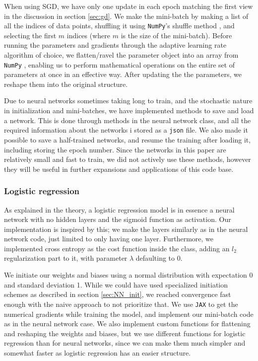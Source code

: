 When using SGD, we have only one update in each epoch matching the first view in the discussion in section \ref{sec:gd}.
We make the mini-batch by making a list of all the indices of data points, shuffling it using \texttt{NumPy}'s shuffle method \cite{NumPy-Array}, and selecting the first $m$ indices (where $m$ is the size of the mini-batch).
Before running the parameters and gradients through the adaptive learning rate algorithm of choice, we flatten/ravel the parameter object into an array from \texttt{NumPy} \cite{NumPy-Array}, enabling us to perform mathematical operations on the entire set of parameters at once in an effective way.
After updating the the parameters, we reshape them into the original structure.

Due to neural networks sometimes taking long to train, and the stochastic nature in initialization and mini-batches, we have implemented methods to save and load a network.
This is done through methods in the neural network class, and all the required information about the networks i stored as a \texttt{json} file.
We also made it possible to save a half-trained networks, and resume the training after loading it, including storing the epoch number.
Since the networks in this paper are relatively small and fast to train, we did not actively use these methods, however they will be useful in further expansions and applications of this code base.

\subsubsection{Logistic regression}

As explained in the theory, a logistic regression model is in essence a neural network with no hidden layers and the sigmoid function as activation.
Our implementation is inspired by this; we make the layers similarly as in the neural network code, just limited to only having one layer.
Furthermore, we implemented cross entropy as the cost function inside the class, adding an $l_2$ regularization part to it, with parameter $\lambda$ defaulting to 0.

We initiate our weights and biases using a normal distribution with expectation 0 and standard deviation 1.
While we could have used specialized initiation schemes as described in section \ref{sec:NN_init}, we reached convergence fast enough with the naive approach to not prioritize that.
We use \texttt{JAX} \cite{jax2018github} to get the numerical gradients while training the model, and implement our mini-batch code as in the neural network case.
We also implement custom functions for flattening and reshaping the weights and biases, but we use different functions for logistic regression than for neural networks, since we can make them much simpler and somewhat faster as logistic regression has an easier structure.

